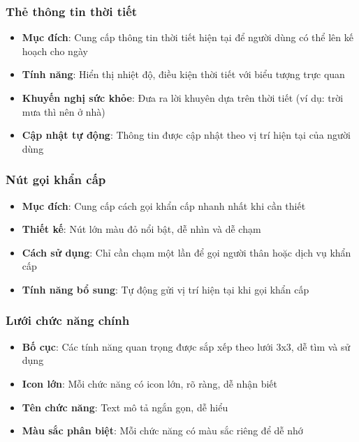 \documentclass[12pt,a4paper]{article}
\begin{document}
\subsubsection{Thẻ thông tin thời tiết}
\begin{itemize}[leftmargin=2cm]
    \item \textbf{Mục đích}: Cung cấp thông tin thời tiết hiện tại để người dùng có thể lên kế hoạch cho ngày
    \item \textbf{Tính năng}: Hiển thị nhiệt độ, điều kiện thời tiết với biểu tượng trực quan
    \item \textbf{Khuyến nghị sức khỏe}: Đưa ra lời khuyên dựa trên thời tiết (ví dụ: trời mưa thì nên ở nhà)
    \item \textbf{Cập nhật tự động}: Thông tin được cập nhật theo vị trí hiện tại của người dùng
\end{itemize}

\subsubsection{Nút gọi khẩn cấp}
\begin{itemize}[leftmargin=2cm]
    \item \textbf{Mục đích}: Cung cấp cách gọi khẩn cấp nhanh nhất khi cần thiết
    \item \textbf{Thiết kế}: Nút lớn màu đỏ nổi bật, dễ nhìn và dễ chạm
    \item \textbf{Cách sử dụng}: Chỉ cần chạm một lần để gọi người thân hoặc dịch vụ khẩn cấp
    \item \textbf{Tính năng bổ sung}: Tự động gửi vị trí hiện tại khi gọi khẩn cấp
\end{itemize}

\subsubsection{Lưới chức năng chính}
\begin{itemize}[leftmargin=2cm]
    \item \textbf{Bố cục}: Các tính năng quan trọng được sắp xếp theo lưới 3x3, dễ tìm và sử dụng
    \item \textbf{Icon lớn}: Mỗi chức năng có icon lớn, rõ ràng, dễ nhận biết
    \item \textbf{Tên chức năng}: Text mô tả ngắn gọn, dễ hiểu
    \item \textbf{Màu sắc phân biệt}: Mỗi chức năng có màu sắc riêng để dễ nhớ
\end{itemize}
\end{document}
